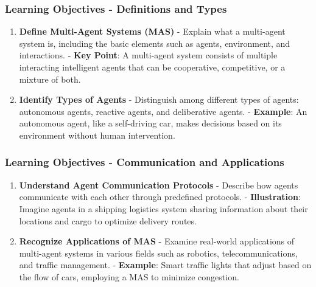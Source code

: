 \documentclass[aspectratio=169]{beamer}
\begin{document}
\begin{frame}[fragile]
    \frametitle{Learning Objectives - Definitions and Types}
    \begin{enumerate}[resume]
        \item \textbf{Define Multi-Agent Systems (MAS)}  
        - Explain what a multi-agent system is, including the basic elements such as agents, environment, and interactions.  
        - \textbf{Key Point}: A multi-agent system consists of multiple interacting intelligent agents that can be cooperative, competitive, or a mixture of both.

        \item \textbf{Identify Types of Agents}  
        - Distinguish among different types of agents: autonomous agents, reactive agents, and deliberative agents.  
        - \textbf{Example}: An autonomous agent, like a self-driving car, makes decisions based on its environment without human intervention.
    \end{enumerate}
\end{frame}

\begin{frame}[fragile]
    \frametitle{Learning Objectives - Communication and Applications}
    \begin{enumerate}[resume]
        \item \textbf{Understand Agent Communication Protocols}  
        - Describe how agents communicate with each other through predefined protocols.  
        - \textbf{Illustration}: Imagine agents in a shipping logistics system sharing information about their locations and cargo to optimize delivery routes.

        \item \textbf{Recognize Applications of MAS}  
        - Examine real-world applications of multi-agent systems in various fields such as robotics, telecommunications, and traffic management.  
        - \textbf{Example}: Smart traffic lights that adjust based on the flow of cars, employing a MAS to minimize congestion.
    \end{enumerate}
\end{frame}
\end{document}
